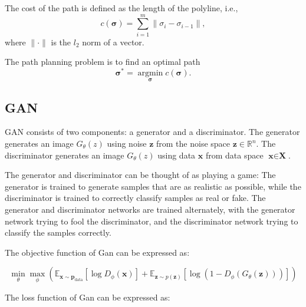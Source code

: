 \documentclass[smallcondensed]{svjour3}     %
\begin{document}
The cost of the path is defined as the length of the polyline, i.e.,
\begin{equation}\label{equation: path-cost}
	c(\bm{\sigma}) = \sum_{i=1}^{m} \lVert \sigma_i - \sigma_{i - 1} \rVert,
\end{equation}
where $\lVert \cdot \rVert$ is the $l_2$ norm of a vector.

The path planning problem is to find an optimal path
\begin{equation}\label{equation: optimal-path}
	\bm{\sigma}^* = \mathop{\arg\min} \limits_{\bm{\sigma}} c(\bm{\sigma}).
\end{equation}

\subsection{GAN}
GAN consists of two components: a generator and a discriminator.
The generator generates an image $G_\theta (z)$ using noise $\textbf{z}$ from the noise space $\textbf{z} \in \mathbb{R}^n $.
The discriminator generates an image $G_\theta (z)$ using data $\textbf{x}$ from data space $\textbf{x} \in \textbf{X}$.

The generator and discriminator can be thought of as playing a game:
The generator is trained to generate samples that are as realistic as possible, while the discriminator is trained to correctly classify samples as real or fake.
The generator and discriminator networks are trained alternately, with the generator network trying to fool the discriminator, and the discriminator network trying to classify the samples correctly.

The objective function of Gan can be expressed as:

\begin{equation}\label{equation: objective funtion-gan}
	\min_{\theta} \max_{\phi} ( \mathbb{E}_{\mathbf{x} \sim \textbf{p}_{\textrm{data}}}[\log D_\phi(\textbf{x})] + 
	\mathbb{E}_{\mathbf{z} \sim p(\textbf{z})}[\log (1-D_\phi(G_\theta(\textbf{z})))] )
\end{equation}

The loss function of Gan can be expressed as:
\end{document}
